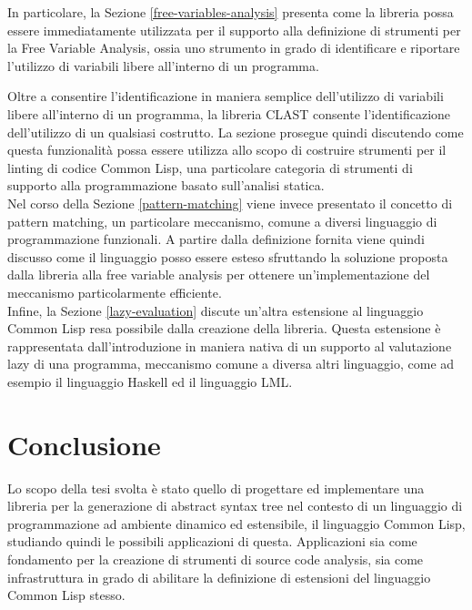 \documentclass{book}
\begin{document}

In particolare, la Sezione \ref{free-variables-analysis} presenta come la
libreria possa essere immediatamente utilizzata per il supporto alla definizione
di strumenti per la Free Variable Analysis, ossia uno strumento in grado di
identificare e riportare l'utilizzo di variabili libere all'interno di un
programma.

Oltre a consentire l'identificazione in maniera semplice dell'utilizzo di
variabili libere all'interno di un programma, la libreria CLAST consente
l'identificazione dell'utilizzo di un qualsiasi costrutto. La sezione prosegue
quindi discutendo come questa funzionalità possa essere utilizza allo scopo di
costruire strumenti per il linting di codice Common Lisp, una particolare
categoria di strumenti di supporto alla programmazione basato sull'analisi
statica.\\

Nel corso della Sezione \ref{pattern-matching} viene invece presentato il
concetto di pattern matching, un particolare meccanismo, comune a diversi
linguaggio di programmazione funzionali. A partire dalla definizione fornita
viene quindi discusso come il linguaggio posso essere esteso sfruttando la
soluzione proposta dalla libreria alla free variable analysis per ottenere
un'implementazione del meccanismo particolarmente efficiente.\\

Infine, la Sezione \ref{lazy-evaluation} discute un'altra estensione al
linguaggio Common Lisp resa possibile dalla creazione della libreria. Questa
estensione è rappresentata dall'introduzione in maniera nativa di un supporto al
valutazione lazy di una programma, meccanismo comune a diversa altri linguaggio,
come ad esempio il linguaggio Haskell ed il linguaggio LML.





\endgroup

\chapter{Conclusione}

Lo scopo della tesi svolta è stato quello di progettare ed implementare una
libreria per la generazione di abstract syntax tree nel contesto di un
linguaggio di programmazione ad ambiente dinamico ed estensibile, il linguaggio
Common Lisp, studiando quindi le possibili applicazioni di questa. Applicazioni
sia come fondamento per la creazione di strumenti di source code analysis, sia
come infrastruttura in grado di abilitare la definizione di estensioni del
linguaggio Common Lisp stesso.\\
\end{document}
